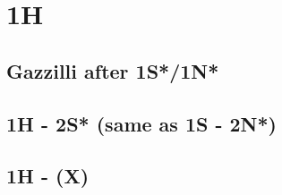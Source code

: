 \section{1H}


\subsection{Gazzilli after 1S*/1N*}


\subsection{1H - 2S* (same as 1S - 2N*)}


\subsection{1H - (X)}


